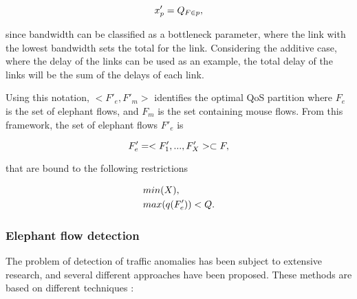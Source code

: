 \begin{equation*}
    \centering
    x'_p = Q_{F \in p},
\end{equation*}

since bandwidth can be classified as a bottleneck parameter, where the link with the lowest bandwidth sets the total for the link. Considering the additive case, 
where the delay of the links can be used as an example, the total delay of the links will be the sum of the delays of each link.

\par Using this notation, $<F'_e, F'_m>$ identifies the optimal QoS partition where $F_e$ is the set of elephant flows, and $F_m$ is the set containing 
mouse flows. From this framework, the set of elephant flows $F'_e$ is

\begin{equation*}
    \centering
    F'_e = <F'_1, ..., F'_X> \subset F,
\end{equation*}

\par that are bound to the following restrictions

\begin{equation*}
    \centering
        \begin{split}
        &min(X), \\ 
        &max(q(F'_e)) < Q.
        \end{split}
\end{equation*}

\subsubsection{Elephant flow detection}

The problem of detection of traffic anomalies has been subject to extensive research, and several different approaches have been proposed. These methods are
based on different techniques \cite{curtis_mahout:_2011}:

